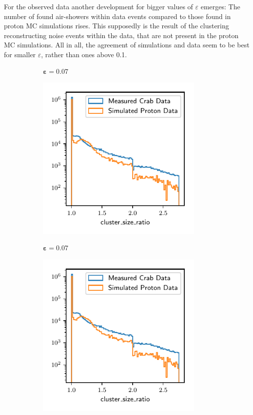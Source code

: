 For the observed data another development for bigger values of $\varepsilon$
emerges: The number of found air-showers within data events compared to those
found in proton MC simulations rises. This supposedly is the result of the
clustering reconstructing noise events within the data, that are not present in
the proton MC simulations. All in all, the agreement of simulations and data
seem to be best for smaller $\varepsilon$, rather than ones above \num{0.1}.

%
\begin{figure}
  \begin{subfigure}{0.5\textwidth}
    \centering
    $\symbf{\varepsilon = 0.07}$\par\smallskip
    \includegraphics[width=0.9\textwidth, page=23]{Plots/Epsilon/07_comparison.pdf}
  \end{subfigure}
  \begin{subfigure}{0.5\textwidth}
    \centering
    $\symbf{\varepsilon = 0.07}$\par\smallskip
    \includegraphics[width=0.9\textwidth, page=2]{Plots/Epsilon/07_comparison.pdf}

\end{subfigure}
\end{figure}
